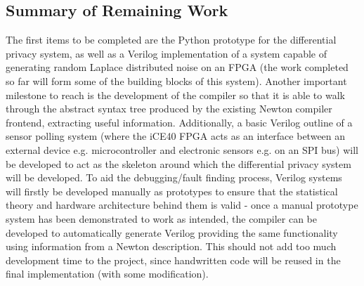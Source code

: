 \documentclass[pageno]{jpaper}
\begin{document}
\subsection{Summary of Remaining Work}
The first items to be completed are the Python prototype for the differential privacy system, as well as a Verilog implementation of a system capable of generating random Laplace distributed noise on an FPGA (the work completed so far will form some of the building blocks of this system). Another important milestone to reach is the development of the compiler so that it is able to walk through the abstract syntax tree produced by the existing Newton compiler frontend, extracting useful information. Additionally, a basic Verilog outline of a sensor polling system (where the iCE40 FPGA acts as an interface between an external device e.g. microcontroller and electronic sensors e.g. on an SPI bus) will be developed to act as the skeleton around which the differential privacy system will be developed. To aid the debugging/fault finding process, Verilog systems will firstly be developed manually as prototypes to ensure that the statistical theory and hardware architecture behind them is valid - once a manual prototype system has been demonstrated to work as intended, the compiler can be developed to automatically generate Verilog providing the same functionality using information from a Newton description. This should not add too much development time to the project, since handwritten code will be reused in the final implementation (with some modification).
\end{document}

